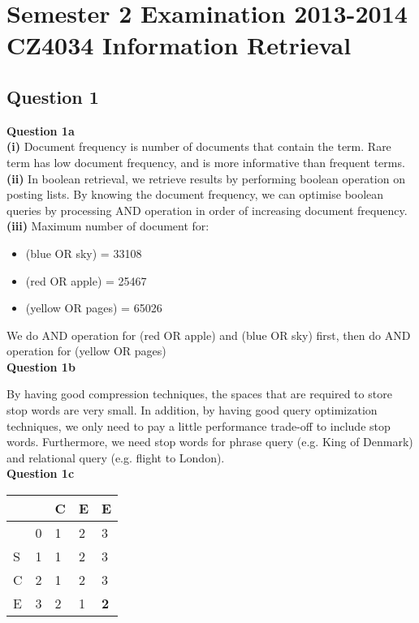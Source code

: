 \documentclass[11pt,a4paper]{report}
\begin{document}
\chapter{Semester 2 Examination 2013-2014\\CZ4034 Information Retrieval}

\begin{multicols*}{2}

\section{Question 1}

\noindent \textbf{Question 1a} \\

\noindent \textbf{(i)} Document frequency is number of documents that contain the term. Rare term has low document frequency, and is more informative than frequent terms.\\

\noindent \textbf{(ii)} In boolean retrieval, we retrieve results by performing boolean operation on posting lists. By knowing the document frequency, we can optimise boolean queries by processing AND operation in order of increasing document frequency.\\

\noindent \textbf{(iii)} Maximum number of document for:
\begin{itemize}
    \item (blue OR sky) = 33108
    \item (red OR apple) = 25467
    \item (yellow OR pages) = 65026
\end{itemize}

\noindent We do AND operation for (red OR apple) and (blue OR sky) first, then do AND operation for (yellow OR pages)\\

\noindent \textbf{Question 1b}

\noindent By having good compression techniques, the spaces that are required to store stop words are very small. In addition, by having good query optimization techniques, we only need to pay a little performance trade-off to include stop words. Furthermore, we need stop words for phrase query (e.g. King of Denmark) and relational query (e.g. flight to London). \\

\noindent \textbf{Question 1c}

\begin{center}
\begin{tabular}{ | l | l  l  l  l  |}
    \hline
      &   & C & E & E \\
    \hline
      & 0 & 1 & 2 & 3 \\
    S & 1 & 1 & 2 & 3 \\
    C & 2 & 1 & 2 & 3 \\
    E & 3 & 2 & 1 & \textbf{2} \\
    \hline
\end{tabular}
\end{center}


\end{multicols*}
\end{document}

